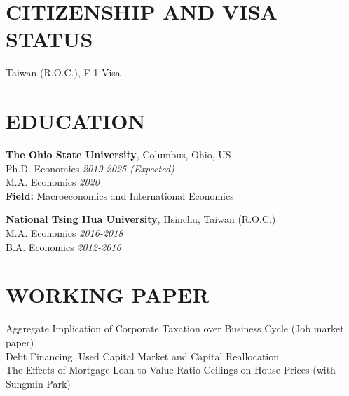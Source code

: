 \documentclass[12pt]{res} %
\begin{document}
\begin{resume}

\section{CITIZENSHIP AND VISA STATUS}
\vspace{8pt} %
Taiwan (R.O.C.), F-1 Visa


\section{EDUCATION}
\vspace{8pt} %
{\bf The Ohio State University}, Columbus, Ohio, US \\
Ph.D. Economics \hfill  \textit{2019-2025 (\textit{Expected})} \\
M.A. Economics \hfill  \textit{2020} \\
\textbf{Field: } Macroeconomics and International Economics

{\bf National Tsing Hua University}, Hsinchu, Taiwan (R.O.C.) \\
M.A. Economics \hfill  \textit{2016-2018} \\
B.A. Economics \hfill  \textit{2012-2016}


\section{WORKING PAPER}
\label{sec:research_experience}
\vspace{8pt} %
Aggregate Implication of Corporate Taxation over Business Cycle (Job market paper) \\
Debt Financing, Used Capital Market and Capital Reallocation \\
The Effects of Mortgage Loan-to-Value Ratio Ceilings on House Prices (with Sungmin Park)




\end{resume}
\end{document}
